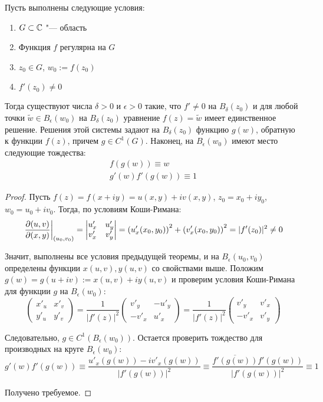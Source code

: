 \begin{theorem}
	Пусть выполнены следующие условия:
	\begin{enumerate}
		\item $G \subset \mathbb{C}$ "--- область
		\item Функция $f$ регулярна на $G$
		\item $z_0 \in G$, $w_0 := f(z_0)$
		\item $f'(z_0) \ne 0$
	\end{enumerate}

	Тогда существуют числа $\delta > 0$ и $\epsilon > 0$ такие, что $f' \ne 0$ на $B_\delta(z_0)$ и для любой точки $\widetilde w \in B_\epsilon(w_0)$ на $B_\delta(z_0)$ уравнение $f(z) = \widetilde w$ имеет единственное решение. Решения этой системы задают на $B_\delta(z_0)$ функцию $g(w)$, обратную к функции $f(z)$, причем $g \in C^1(G)$. Наконец, на $B_\epsilon(w_0)$ имеют место следующие тождества:
	\vspace{-6pt}
	\begin{gather*}
		f(g(w)) \equiv w \\ g'(w)f'(g(w)) \equiv 1
	\end{gather*}
\end{theorem}

\begin{proof}
	Пусть $f(z) = f(x + iy) = u(x, y) + iv(x, y)$, $z_0 = x_0 + iy_0$, $w_0 = u_0 + iv_0$. Тогда, по условиям Коши-Римана:
	\[\left.\frac{\partial (u, v)}{\partial (x, y)}\right|_{(u_0, v_0)} = \begin{vmatrix}
		u'_x & u'_y \\ v'_x & v'_y
	\end{vmatrix} = \left(u'_x(x_0, y_0)\right)^2 + \left(v'_x(x_0, y_0)\right)^2 = |f'(z_0)|^2 \ne 0\]

	Значит, выполнены все условия предыдущей теоремы, и на $B_\epsilon(u_0, v_0)$ определены функции $x(u, v), y(u, v)$ со свойствами выше. Положим $g(w) = g(u + iv) := x(u, v) + iy(u, v)$ и проверим условия Коши-Римана для функции $g$ на $B_\epsilon(w_0)$:
	\[\begin{pmatrix}
		x'_u & x'_v \\
		y'_u & y'_v
	\end{pmatrix}
	=
	\frac1{|f'(z)|^2}\begin{pmatrix}
		v'_y & -u'_y \\
		-v'_x & u'_x
	\end{pmatrix} = \frac1{|f'(z)|^2}\begin{pmatrix}
	v'_y & v'_x \\
	-v'_x & v'_y
	\end{pmatrix}\]
	
	Следовательно, $g \in C^1(B_\epsilon(w_0))$. Остается проверить тождество для производных на круге $B_\epsilon(w_0)$:
	\vspace*{-6pt}
	\[g'(w)f'(g(w)) \equiv \frac{u'_x(g(w)) - iv'_x(g(w))}{|f'(g(w))|^2} \equiv \frac{\overline{f'(g(w))}f'(g(w))}{|f'(g(w))|^2} \equiv 1\]
	
	Получено требуемое.
\end{proof}

